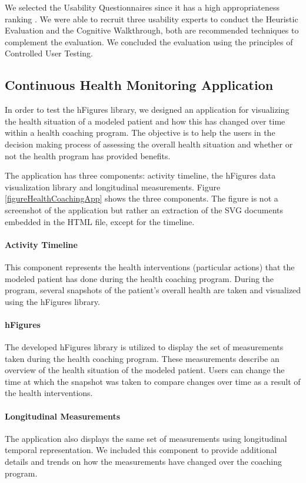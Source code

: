 \documentclass[twocolumn]{bmcart}%
\begin{document}
We selected the Usability Questionnaires since it has a high appropriateness ranking \cite{johnson2011ehr}. We were able to recruit three usability experts to conduct the Heuristic Evaluation and the Cognitive Walkthrough, both are recommended techniques to complement the evaluation. We concluded the evaluation using the principles of Controlled User Testing.

\subsection*{Continuous Health Monitoring Application}

In order to test the hFigures library, we designed an application for visualizing the health situation of a modeled patient and how this has changed over time within a health coaching program. The objective is to help the users in the decision making process of assessing the overall health situation and whether or not the health program has provided benefits.

The application has three components: activity timeline, the hFigures data visualization library and longitudinal measurements. Figure \ref{figureHealthCoachingApp} shows the three components. The figure is not a screenshot of the application but rather an extraction of the SVG documents embedded in the HTML file, except for the timeline.

\paragraph*{Activity Timeline} This component represents the health interventions (particular actions) that the modeled patient has done during the health coaching program. During the program, several snapshots of the patient's overall health are taken and visualized using the hFigures library.

\paragraph*{hFigures} The developed hFigures library is utilized to display the set of measurements taken during the health coaching program. These measurements describe an overview of the health situation of the modeled patient. Users can change the time at which the snapshot was taken to compare changes over time as a result of the health interventions.

\paragraph*{Longitudinal Measurements} The application also displays the same set of measurements using longitudinal temporal representation. We included this component to provide additional details and trends on how the measurements have changed over the coaching program.
\end{document}
